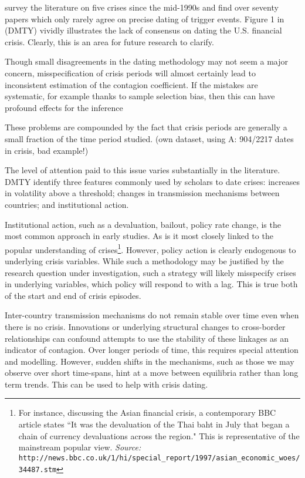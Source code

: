 \documentclass[../base.tex]{subfiles}
\begin{document}
\cite{fry2011actually} survey the literature on five crises since the mid-1990s and find over seventy papers which only rarely agree on precise dating of trigger events. Figure 1 in  \cite{dungey2015endogenous} (DMTY) vividly illustrates the lack of consensus on dating the U.S. financial crisis. Clearly, this is an area for future research to clarify.

Though small disagreements in the dating methodology may not seem a major concern, misspecification of crisis periods will almost certainly lead to inconsistent estimation of the contagion coefficient. If the mistakes are systematic, for example thanks to sample selection bias, then this can have profound effects for the inference 

These problems are compounded by the fact that crisis periods are generally a small fraction of the time period studied. (own dataset, using A: 904/2217 dates in crisis, bad example!)

The level of attention paid to this issue varies substantially in the literature. DMTY identify three  features commonly used by scholars to date crises: increases in volatility above a threshold; changes in transmission mechanisms between countries; and institutional action.

Institutional action, such as a devaluation, bailout, policy rate change, is the most common approach in early studies. As is it most closely linked to the popular understanding of crises\footnote{For instance, discussing the Asian financial crisis, a contemporary BBC article states ``It was the devaluation of the Thai baht in July that began a chain of currency devaluations across the region." This is representative of the mainstream popular view.
	\textit{Source:} \texttt{http://news.bbc.co.uk/1/hi/special\_report/1997/asian\_economic\_woes/34487.stm}}. However, policy action is clearly endogenous to underlying crisis variables. While such a methodology may be justified by the research question under investigation, such a strategy will likely misspecify crises in underlying variables, which policy will respond to with a lag. This is true both of the start and end of crisis episodes. 

Inter-country transmission mechanisms do not remain stable over time even when there is no crisis. Innovations or underlying structural changes to cross-border relationships can confound attempts to use the stability of these linkages as an indicator of contagion. Over longer periods of time, this requires special attention and modelling. However, sudden shifts in the mechanisms, such as those we may observe over short time-spans, hint at a move between equilibria rather than long term trends. This can be used to help with crisis dating.
\end{document}

